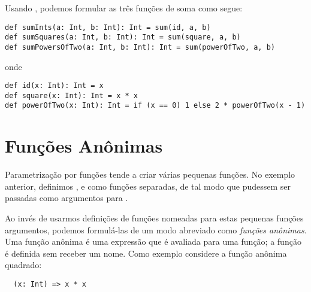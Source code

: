 Usando , podemos formular as tr\^{e}s fun\c{c}\~{o}es de soma como segue: 
\begin{lstlisting}
def sumInts(a: Int, b: Int): Int = sum(id, a, b)
def sumSquares(a: Int, b: Int): Int = sum(square, a, b)
def sumPowersOfTwo(a: Int, b: Int): Int = sum(powerOfTwo, a, b)
\end{lstlisting}
onde 
\begin{lstlisting}
def id(x: Int): Int = x
def square(x: Int): Int = x * x
def powerOfTwo(x: Int): Int = if (x == 0) 1 else 2 * powerOfTwo(x - 1)
\end{lstlisting}


\section{Fun\c{c}\~{o}es An\^{o}nimas}
Parametriza\c{c}\~{a}o por fun\c{c}\~{o}es tende a criar v\'{a}rias pequenas fun\c{c}\~{o}es. No exemplo 
anterior, definimos ,  e  como fun\c{c}\~{o}es 
separadas, de tal modo que pudessem ser passadas como argumentos para .    


Ao inv\'{e}s de usarmos defini\c{c}\~{o}es de fun\c{c}\~{o}es nomeadas para estas pequenas fun\c{c}\~{o}es 
argumentos, podemos formul\'{a}-las de um modo abreviado como {\em fun\c{c}\~{o}es an\^{o}nimas}.
Uma fun\c{c}\~{a}o an\^{o}nima \'{e} uma express\~{a}o que \'{e} avaliada para uma fun\c{c}\~{a}o; a fun\c{c}\~{a}o \'{e} 
definida sem receber um nome. Como exemplo considere a fun\c{c}\~{a}o an\^{o}nima quadrado:
\begin{lstlisting}
  (x: Int) => x * x
\end{lstlisting}
  

